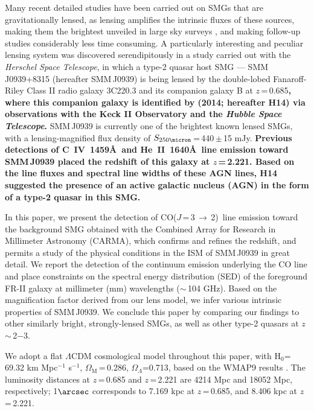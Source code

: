 \documentclass[iop, revtex4]{emulateapj}
\newcommand{\CO}{\mbox{CO($J$\,=\,3\,$\rightarrow$\,2) }}
\newcommand{\pmOne}{\mbox{$^{-1}$}}
\begin{document}
Many recent detailed studies have been carried out on SMGs that are gravitationally lensed,
 as lensing amplifies the intrinsic fluxes of these sources, making them the brightest unveiled in large sky surveys \citep{Negrello10a,Vieira10a,Oliver12a}, and making follow-up studies considerably less time consuming.
A particularly interesting and peculiar lensing system was discovered serendipitously in a study carried out with the {\it Herschel Space Telescope}, in which
a type-2 quasar host SMG --- SMM\,J0939+8315 (hereafter SMM\,J0939) is being lensed by the double-lobed Fanaroff-Riley
Class II \citep*[FR-II; ][]{Fanaroff74} radio galaxy 3C220.3 and its
companion galaxy B at $z$\,=\,0.685{\bf, where this companion galaxy is identified by \citeauthor{Haas14} (2014; hereafter H14) via observations with the Keck II Observatory and the {\it Hubble Space Telescope}.}
SMM\,J0939 is currently one of the brightest known lensed
SMGs, with a lensing-magnified flux density of $S_\textrm{250\micron}$\,=\,440\,$\pm$\,15 mJy.
{\bf Previous detections of C~{\scriptsize\sc IV}~1459\AA\
 and He~{\scriptsize\sc II}~1640\AA\ line emission toward SMM\,J0939
 placed the redshift of this galaxy at $z$\,=\,2.221. Based on the line fluxes and spectral line widths of these AGN lines, H14 suggested the presence of an active galactic nucleus (AGN) in the form of a type-2 quasar in this SMG.}
 
In this paper, we present the detection of \CO line emission toward the background SMG obtained with the Combined
Array for Research in Millimeter Astronomy (CARMA), which confirms and refines the redshift, and permits a study of the physical conditions in the ISM of SMM\,J0939 in great detail. We report the detection of the continuum emission underlying the CO line and place constraints on the spectral energy distribution (SED) of the foreground FR-II galaxy at millimeter (mm) wavelengths ($\sim$\,104 GHz). Based on the magnification factor derived from our lens model, we infer various intrinsic properties of SMM\,J0939. We 
conclude this paper by comparing our findings to other similarly bright, strongly-lensed SMGs, as well as other type-2 quasars at $z$\,$\sim$\,2$-$3.

We adopt a flat $\Lambda$CDM cosmological model throughout this paper, with H$_0$= 69.32 km\,\,Mpc\pmOne\,\,s\pmOne, $\Omega_\textrm{M}$\,=\,0.286, $\Omega_\Lambda$=0.713, based on the WMAP9 results \citep{Hinshaw13a}.
The luminosity distances at $z$\,=\,0.685 and $z$\,=\,2.221 are 4214 Mpc and 18052 Mpc, respectively; 1$\arcsec$
corresponds to 7.169 kpc at $z$\,=\,0.685, and 8.406 kpc at $z$\,=\,2.221.
\end{document}
